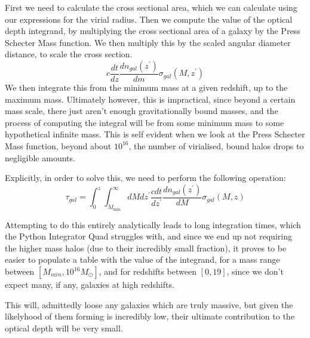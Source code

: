 \documentclass[11pt]{article}
\begin{document}
First we need to calculate the cross sectional area, which we can
calculate using our expressions for the virial radius. Then we compute
the value of the optical depth integrand, by multiplying the cross
sectional area of a galaxy by the Press Schecter Mass function. We then
multiply this by the scaled angular diameter distance, to scale the
cross section.
\[ c \frac{dt}{dz} \frac{dn_{gal}(z^\prime)}{dm} \sigma_{gal}(M,z^\prime)\]
We then integrate this from the minimum mass at a given redshift, up to
the maximum mass. Ultimately however, this is impractical, since beyond
a certain mass scale, there just aren't enough gravitationally bound
masses, and the process of computing the integral will be from some
minimum mass to some hypothetical infinite mass. This is self evident
when we look at the Press Schecter Mass function, beyond about
\(10^{16}\), the number of virialised, bound halos drops to negligible
amounts.

Explicitly, in order to solve this, we need to perform the following
operation:
\[ \tau _ { g a l } = \int _ { 0 } ^ { z } \int _ { M _ { \min } } ^ { \infty } d M d z ^ { \prime } \frac{c dt}{dz^\prime} \frac {d n _ { g a l } \left( z ^ { \prime } \right) } { d M } \sigma _ { g a l } ( M , z ) \]

Attempting to do this entirely analytically leads to long integration
times, which the Python Integrator Quad struggles with, and since we end
up not requiring the higher mass halos (due to their incredibly small
fraction), it proves to be easier to populate a table with the value of
the integrand, for a mass range between
\([M_{min} , 10^{16} M_{\odot}]\), and for redshifts between \([0,19]\),
since we don't expect many, if any, galaxies at high redshifts.

This will, admittedly loose any galaxies which are truly massive, but
given the likelyhood of them forming is incredibly low, their ultimate
contribution to the optical depth will be very small.
\end{document}
